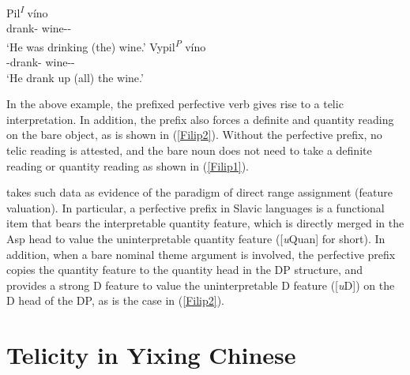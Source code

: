 \documentclass[output=paper]{langsci/langscibook}
\begin{document}
\begin{exe}
\ex {} \parencite[62]{filip1997}
    \begin{xlist}
	\ex\label{Filip1} \gll Pil\textsuperscript{\emph{I}} v\'ino \\
	        {drank-\Sg{}{}} {wine-\Sg{}-\Acc{}} \\
	    \glt \enquote*{He was drinking (the) wine.}
    \ex\label{Filip2} \gll  Vypil\textsuperscript{\emph{P}} v\'ino\\
            {\Pfv{}-drank-\Sg{}{}} {wine-\Sg{}-\Acc{}} \\
        \glt \enquote*{He drank up (all) the wine.}
\end{xlist}
\end{exe}

In the above example, the prefixed perfective verb gives rise to a telic
interpretation. In     addition, the prefix also forces a definite and quantity
reading on the bare object, as is shown in (\ref{Filip2}). Without the
perfective prefix, no telic reading is attested, and the bare noun does not
need to take a definite reading or quantity reading as shown in (\ref{Filip1}).

\textcite{Borer2005b} takes such data as evidence of the paradigm of direct
range assignment (feature valuation). In particular, a perfective prefix in
Slavic languages is a functional item that bears the interpretable quantity
feature, which is directly merged in the Asp head to value the
uninterpretable quantity feature ([\emph{u}Quan] for short). In addition, when
a bare nominal theme argument is involved, the perfective prefix copies the
quantity feature to the quantity head in the DP structure, and provides a
strong D feature to value the uninterpretable D feature ([\emph{u}D])
on the D head of the DP, as is the case in (\ref{Filip2}).

\section{Telicity in Yixing Chinese}\label{sec:17.4}
\end{document}

